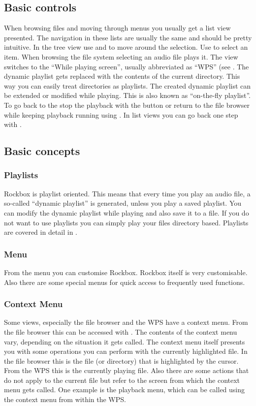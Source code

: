 \subsection{Basic controls}
When browsing files and moving through menus you usually get a list view
presented. The navigation in these lists are usually the same and should be
pretty intuitive.
In the tree view use \ActionStdNext{} and \ActionStdPrev{} to move around
the selection. Use \ActionStdOk{} to select an item. When browsing the file
system selecting an audio file plays it. The view switches to the ``While
playing screen'', usually abbreviated as ``WPS'' (see . The
dynamic playlist gets replaced with the contents of the current directory. This
way you can easily treat directories as playlists. The created dynamic playlist can
be extended or modified while playing. This is also known as
``on-the-fly playlist''.
To go back to the  stop the playback with the
\ActionWpsStop{} button or return to the file browser while keeping playback
running using \ActionWpsBrowse{}.
In list views you can go back one step with \ActionTreeParentDirectory.

\subsection{Basic concepts}
\subsubsection{Playlists}
Rockbox is playlist oriented. This means that every time you play an audio file,
a so-called ``dynamic playlist'' is generated, unless you play a saved
playlist. You can modify the dynamic playlist while playing and also save
it to a file. If you do not want to use playlists you can simply play your
files directory based.
Playlists are covered in detail in .

\subsubsection{Menu}
From the menu you can customise Rockbox. Rockbox itself is very customisable.
Also there are some special menus for quick access to frequently used
functions.

\subsubsection{Context Menu}
Some views, especially the file browser and the WPS have a context menu.
From the file browser this can be accessed with \ActionStdContext{}.
The contents of the context menu vary, depending on the situation it gets
called. The context menu itself presents you with some operations you can
perform with the currently highlighted file. In the file browser this is
the file (or directory) that is highlighted by the cursor. From the WPS this is
the currently playing file. Also there are some actions that do not apply
to the current file but refer to the screen from which the context menu
gets called. One example is the playback menu, which can be called using
the context menu from within the WPS.

